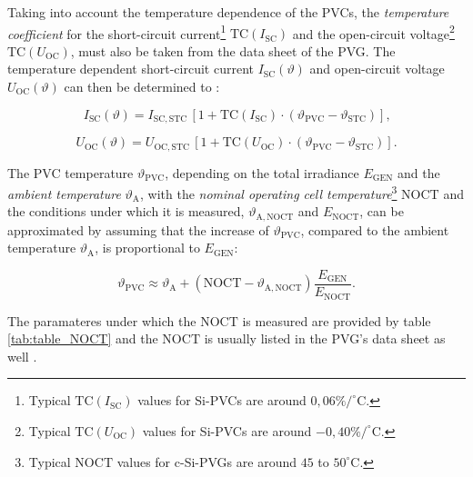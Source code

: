 Taking into account the temperature dependence of the PVCs, the \emph{temperature coefficient} for the short-circuit current\footnote{Typical $\mathrm{TC}\left(I_{\mathrm{SC}}\right)$ values for Si-PVCs are around $0,06 \% / ^\circ \mathrm{C}$.} $\mathrm{TC}\left(I_{\mathrm{SC}}\right)$ and the open-circuit voltage\footnote{Typical $\mathrm{TC}\left(U_{\mathrm{OC}}\right)$ values for Si-PVCs are around $-0,40 \% / ^\circ \mathrm{C}$.} $\mathrm{TC}\left(U_{\mathrm{OC}}\right)$, must also be taken from the data sheet of the PVG. The temperature dependent short-circuit current $I_{\mathrm{SC}}\left(\vartheta\right)$ and open-circuit voltage $U_{\mathrm{OC}}\left(\vartheta\right)$ can then be determined to \cite{Mertens:2015}: 

\begin{center}
	\begin{equation} \label{eq:i_short_circuit}
		I_{\mathrm{SC}}\left(\vartheta\right) = I_{\mathrm{SC,STC}} \, \left[ 1 + \mathrm{TC}\left(I_{\mathrm{SC}}\right) \cdot \left(\vartheta_{\mathrm{PVC}} - \vartheta_{\mathrm{STC}} \right) \right] \text{,}
	\end{equation}
\end{center}

\begin{center}
	\begin{equation} \label{eq:i_short_circuit}
		U_{\mathrm{OC}}\left(\vartheta\right) = U_{\mathrm{OC,STC}} \, \left[ 1 + \mathrm{TC}\left(U_{\mathrm{OC}}\right) \cdot \left(\vartheta_{\mathrm{PVC}} - \vartheta_{\mathrm{STC}} \right) \right] \text{.}
	\end{equation}
\end{center}

The PVC temperature $\vartheta_{\mathrm{PVC}}$, depending on the total irradiance $E_{\mathrm{GEN}}$ and the \emph{ambient temperature} $\vartheta_{\mathrm{A}}$, with the \emph{nominal operating cell temperature}\footnote{Typical $\mathrm{NOCT}$ values for c-Si-PVGs are around $45$ to $50^\circ \mathrm{C}$.} $\mathrm{NOCT}$ and the conditions under which it is measured, $\vartheta_{\mathrm{A,NOCT}}$ and $E_{\mathrm{NOCT}}$, can be approximated by assuming that the increase of $\vartheta_{\mathrm{PVC}}$, compared to the ambient temperature $\vartheta_{\mathrm{A}}$, is proportional to $E_{\mathrm{GEN}}$:
\begin{center}
	\begin{equation} \label{eq:cell_temp}
		\vartheta_{\mathrm{PVC}} \approx \vartheta_{\mathrm{A}} + \left(\mathrm{NOCT} - \vartheta_{\mathrm{A,NOCT}}\right) \frac{E_{\mathrm{GEN}}}{E_{\mathrm{NOCT}}} \text{.}
	\end{equation}
\end{center}
The paramateres under which the $\mathrm{NOCT}$ is measured are provided by table \ref{tab:table_NOCT} and the $\mathrm{NOCT}$ is usually listed in the PVG's data sheet as well \cite{Mertens:2015}.


